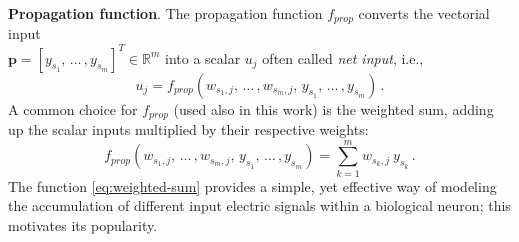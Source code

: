 \documentclass[12pt, a4paper, twoside, openright, notitlepage]{report}
\numberwithin{equation}{chapter}
\theoremstyle{theorem}
\theoremstyle{definition}
\theoremstyle{remark}
\theoremstyle{proposition}
\numberwithin{figure}{chapter}
\begin{document}
		\noindent \textbf{Propagation function}. The propagation function $f_{prop}$ converts the vectorial input \\ $\mathbf{p} = [y_{s_1}, \, \ldots \, , y_{s_m}]^T \in \mathbb{R}^m$ into a scalar $u_{j}$ often called \emph{net input}, i.e.,
		\begin{equation*}
			\label{eq:propagation-function}
			u_{j} = f_{prop}(w_{s_1,j}, \, \ldots \, , w_{s_m,j}, \, y_{s_1}, \, \ldots \, , y_{s_m}) \, .
		\end{equation*}
		A common choice for $f_{prop}$ (used also in this work) is the weighted sum, adding up the scalar inputs multiplied by their respective weights:
		\begin{equation}
			\label{eq:weighted-sum}
			f_{prop}(w_{s_1,j}, \, \ldots \, , w_{s_m,j}, \, y_{s_1}, \, \ldots \, , y_{s_m}) = \sum_{k = 1}^m w_{s_k,j} ~ y_{s_k} \, .
		\end{equation} 
		The function \eqref{eq:weighted-sum} provides a simple, yet effective way of modeling the accumulation of different input electric signals within a biological neuron; this motivates its popularity.
				
		\vspace*{0.3cm}
		
\end{document}
